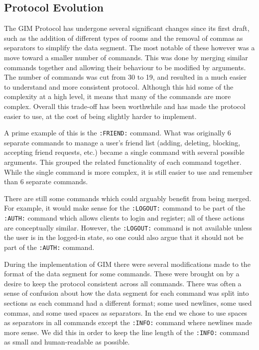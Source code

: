 \subsection{Protocol Evolution}
\label{protocol_evol}

The GIM Protocol has undergone several significant changes since its first draft, such as the addition of different types of rooms and the removal of commas as separators to simplify the data segment. The most notable of these however was a move toward a smaller number of commands. This was done by merging similar commands together and allowing their behaviour to be modified by arguments. The number of commands was cut from 30 to 19, and resulted in a much easier to understand and more consistent protocol. Although this hid some of the complexity at a high level, it means that many of the commands are more complex. Overall this trade-off has been worthwhile and has made the protocol easier to use, at the cost of being slightly harder to implement.

A prime example of this is the \texttt{:FRIEND:} command. What was originally 6 separate commands to manage a user's friend list (adding, deleting, blocking, accepting friend requests, etc.) became a single command with several possible arguments. This grouped the related functionality of each command together. While the single command is more complex, it is still easier to use and remember than 6 separate commands.

There are still some commands which could arguably benefit from being merged. For example, it would make sense for the \texttt{:LOGOUT:} command to be part of the \texttt{:AUTH:} command which allows clients to login and register; all of these actions are conceptually similar. However, the \texttt{:LOGOUT:} command is not available unless the user is in the logged-in state, so one could also argue that it should not be part of the \texttt{:AUTH:} command.

During the implementation of GIM there were several modifications made to the format of the data segment for some commands. These were brought on by a desire to keep the protocol consistent across all commands. There was often a sense of confusion about how the data segment for each command was split into sections as each command had a different format; some used newlines, some used commas, and some used spaces as separators. In the end we chose to use spaces as separators in all commands except the \texttt{:INFO:} command where newlines made more sense. We did this in order to keep the line length of the \texttt{:INFO:} command as small and human-readable as possible.

